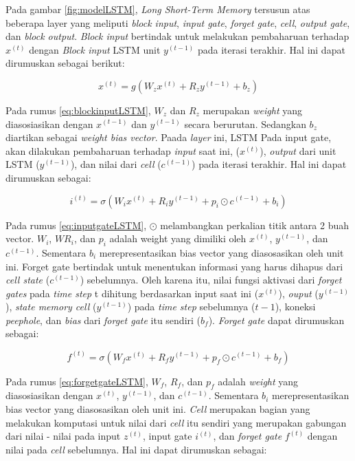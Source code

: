 Pada gambar \ref{fig:modelLSTM}, \textit{Long Short-Term Memory} tersusun atas beberapa layer yang meliputi \textit{block input}, \textit{input gate}, \textit{forget gate}, \textit{cell}, \textit{output gate}, dan \textit{block output}. \textit{Block input} bertindak untuk melakukan pembaharuan terhadap $x^{(t)}$ dengan \textit{Block input} LSTM unit $y^{(t-1)}$ pada iterasi terakhir. Hal ini dapat dirumuskan sebagai berikut:

\begin{equation}
  \label{eq:blockinputLSTM}
  x^{(t)} = g(W_z x^{(t)} + R_z y^{(t-1)} + b_z)
\end{equation}

Pada rumus \ref{eq:blockinputLSTM}, $W_z$ dan $R_z$ merupakan \textit{weight} yang diasosiasikan dengan $x^{(t-1)}$ dan $y^{(t-1)}$ secara berurutan. Sedangkan $b_z$ diartikan sebagai \textit{weight bias vector}. Paada \textit{layer} ini, LSTM   Pada input gate, akan dilakukan pembaharuan terhadap \textit{input} saat ini, ($x^{(t)}$), \textit{output} dari unit LSTM ($y^{(t-1)}$), dan nilai dari \textit{cell} ($c^{(t-1)}$) pada iterasi terakhir. Hal ini  dapat dirumuskan sebagai:

\begin{equation}
    \label{eq:inputgateLSTM}
    i^{(t)} = \sigma(W_i x^{(t)} + R_i y^{(t-1)}+ p_i \odot c^{(t-1)} + b_i)
\end{equation}

Pada rumus \ref{eq:inputgateLSTM}, $\odot$ melambangkan perkalian titik antara 2 buah vector. $W_i$, $WR_i$, dan $p_i$ adalah weight yang dimiliki oleh $x^{(t)}$, $y^{(t-1)}$, dan $c^{(t-1)}$. Sementara $b_i$ merepresentasikan bias vector yang diasosasikan oleh unit ini. Forget gate bertindak untuk menentukan informasi yang harus dihapus dari \textit{cell state} ($c^{(t-1)}$) sebelumnya. Oleh karena itu, nilai fungsi aktivasi dari \textit{forget gates} pada \textit{time step} t dihitung berdasarkan input saat ini ($x^{(t)}$), \textit{ouput} ($y^{(t - 1)}$), \textit{state memory cell} ($y^{(t - 1)}$) pada \textit{time step} sebelumnya ($t - 1$), koneksi \textit{peephole}, dan \textit{bias} dari \textit{forget gate} itu sendiri (${b_f}$). \textit{Forget gate} dapat dirumuskan sebagai:

\begin{equation}
    \label{eq:forgetgateLSTM}
    f^{(t)} = \sigma(W_f x^{(t)} + R_f y^{(t-1)}+ p_f \odot c^{(t-1)} + b_f)
\end{equation}

Pada rumus \ref{eq:forgetgateLSTM}, $W_f$, $R_f$, dan $p_f$ adalah \textit{weight} yang diasosiasikan dengan $x^{(t)}$, $y^{(t-1)}$, dan $c^{(t-1)}$. Sementara $b_i$ merepresentasikan bias vector yang diasosasikan oleh unit ini. \textit{Cell} merupakan bagian yang melakukan komputasi untuk nilai dari \textit{cell} itu sendiri yang merupakan gabungan dari nilai - nilai pada input $z^{(t)}$, input gate $i^{(t)}$, dan \textit{forget gate} $f^{(t)}$ dengan nilai pada \textit{cell} sebelumnya. Hal ini dapat dirumuskan sebagai:

